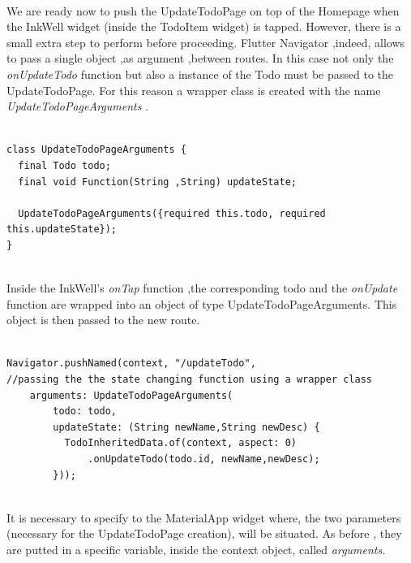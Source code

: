  \mbox{}\\
We are ready now to push the UpdateTodoPage on top of the Homepage when the InkWell widget (inside the TodoItem widget) is tapped. However, there is a small extra step to perform before proceeding.  Flutter Navigator ,indeed, allows to pass a single object ,as argument ,between routes. In this case not only the \textit{onUpdateTodo} function but also a instance of the Todo must be passed to the UpdateTodoPage. For this reason a wrapper class is created with the name \textit{UpdateTodoPageArguments }.
\mbox{}\\
\begin{code}
\mbox{}
\label{code:2.40}
\begin{verbatim}

class UpdateTodoPageArguments {
  final Todo todo;
  final void Function(String ,String) updateState;

  UpdateTodoPageArguments({required this.todo, required this.updateState});
}
\end{verbatim}
\end{code}
\mbox{}\\
Inside the InkWell’s \textit{onTap }function ,the corresponding todo and the \textit{onUpdate} function are wrapped into an object of type UpdateTodoPageArguments. This object is then passed to the new route.
\mbox{}\\
\begin{code}
\mbox{}
\label{code:2.42}
\begin{verbatim}

Navigator.pushNamed(context, "/updateTodo",
//passing the the state changing function using a wrapper class
    arguments: UpdateTodoPageArguments(
        todo: todo,
        updateState: (String newName,String newDesc) {
          TodoInheritedData.of(context, aspect: 0)
              .onUpdateTodo(todo.id, newName,newDesc);
        }));
\end{verbatim}
\end{code}
\mbox{}\\
It is necessary to specify to the MaterialApp widget where, the two parameters (necessary for the UpdateTodoPage creation), will be situated. As before , they are putted in a specific variable, inside the context object, called \textit{arguments.}
\mbox{}\\
